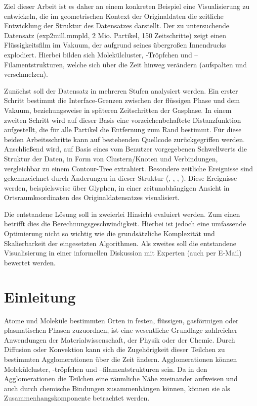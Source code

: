 Ziel dieser Arbeit ist es daher an einem konkreten Beispiel eine Visualisierung zu entwickeln, die im geometrischen Kontext der Originaldaten die zeitliche Entwicklung der Struktur des Datensatzes darstellt. Der zu untersuchende Datensatz (exp2mill.mmpld, 2 Mio. Partikel, 150 Zeitschritte) zeigt einen Flüssigkeitsfilm im Vakuum, der aufgrund seines übergroßen Innendrucks explodiert. Hierbei bilden sich Molekülcluster, -Tröpfchen und –Filamentstrukturen, welche sich über die Zeit hinweg verändern (aufspalten und verschmelzen).

Zunächst soll der Datensatz in mehreren Stufen analysiert werden. Ein erster Schritt bestimmt die Interface-Grenzen zwischen der flüssigen Phase und dem Vakuum, beziehungsweise in späteren Zeitschritten der Gasphase. In einem zweiten Schritt wird auf dieser Basis eine vorzeichenbehaftete Distanzfunktion aufgestellt, die für alle Partikel die Entfernung zum Rand bestimmt. Für diese beiden Arbeitsschritte kann auf bestehenden Quellcode zurückgegriffen werden. Anschließend wird, auf Basis eines vom Benutzer vorgegebenen Schwellwerts die Struktur der Daten, in Form von Clustern/Knoten und Verbindungen, vergleichbar zu einem Contour-Tree extrahiert. Besondere zeitliche Ereignisse sind gekennzeichnet durch Änderungen in dieser Struktur (, , , ). Diese Ereignisse werden, beispielsweise über Glyphen, in einer zeitunabhängigen Ansicht in Ortsraumkoordinaten des Originaldatensatzes visualisiert.

Die entstandene Lösung soll in zweierlei Hinsicht evaluiert werden. Zum einen betrifft dies die Berechnungsgeschwindigkeit. Hierbei ist jedoch eine umfassende Optimierung nicht so wichtig wie die grundsätzliche Komplexität und Skalierbarkeit der eingesetzten Algorithmen. Als zweites soll die entstandene Visualisierung in einer informellen Diskussion mit Experten (auch per E-Mail) bewertet werden.


\chapter{Einleitung}\label{sec:einleitung}

Atome und Moleküle bestimmten Orten in festen, flüssigen, gasförmigen oder plasmatischen Phasen zuzuordnen, ist eine wesentliche Grundlage zahlreicher Anwendungen der Materialwissenschaft, der Physik oder der Chemie. %
Durch Diffusion oder Konvektion kann sich die Zugehörigkeit dieser Teilchen zu bestimmten Agglomerationen über die Zeit ändern. Agglomerationen können Molekülcluster, -tröpfchen und –filamentstrukturen sein. Da in den Agglomerationen die Teilchen eine räumliche Nähe zueinander aufweisen und auch durch chemische Bindungen zusammenhängen können, können sie als Zusammenhangskomponente betrachtet werden.

